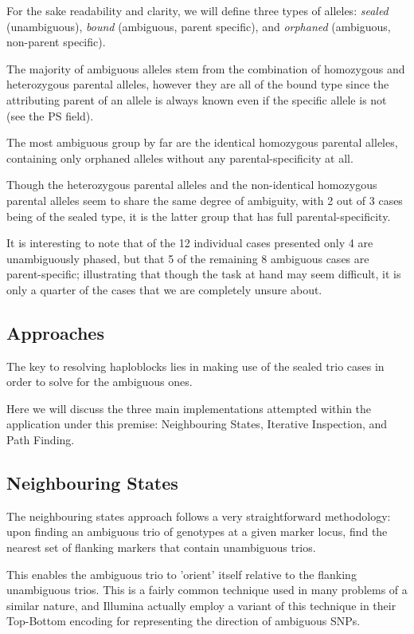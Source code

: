For the sake readability and clarity, we will define three types of alleles: \textit{sealed} (unambiguous), \textit{bound} (ambiguous, parent specific), and \textit{orphaned} (ambiguous, non-parent specific).

The majority of ambiguous alleles stem from the combination of homozygous and heterozygous parental alleles, however they are all of the bound type since the attributing parent of an allele is always known even if the specific allele is not (see the PS field). 

The most ambiguous group by far are the identical homozygous parental alleles, containing only orphaned alleles without any parental-specificity at all.

Though the heterozygous parental alleles and the non-identical homozygous parental alleles seem to share the same degree of ambiguity, with 2 out of 3 cases being of the sealed type, it is the latter group that has full parental-specificity.

It is interesting to note that of the 12 individual cases presented only 4 are unambiguously phased, but that 5 of the remaining 8 ambiguous cases are parent-specific; illustrating that though the task at hand may seem difficult, it is only a quarter of the cases that we are completely unsure about.


\subsection{Approaches}

The key to resolving haploblocks lies in making use of the sealed trio cases in order to solve for the ambiguous ones. 

Here we will discuss the three main implementations attempted within the application under this premise: Neighbouring States, Iterative Inspection, and Path Finding.

\subsection{Neighbouring States}

The neighbouring states approach follows a very straightforward methodology: upon finding an ambiguous trio of genotypes at a given marker locus, find the nearest set of flanking markers that contain unambiguous trios.

This enables the ambiguous trio to 'orient' itself relative to the flanking unambiguous trios.  This is a fairly common technique used in many problems of a similar nature, and Illumina actually employ a variant of this technique in their Top-Bottom encoding for representing the direction of ambiguous SNPs\citep{illuminatopbot}.


